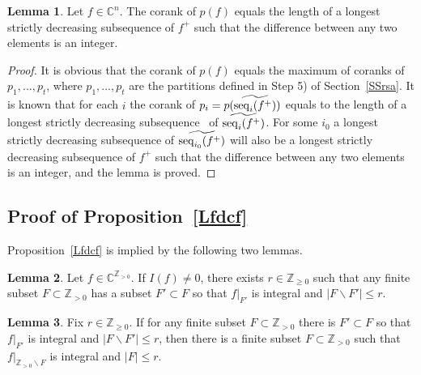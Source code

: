 \documentclass[10pt]{amsart}\oddsidemargin -1mm \evensidemargin -1mm \topmargin -15mm\headheight5mm \headsep 3.5mm \textheight 245mm\textwidth 170mm %
\theoremstyle{definition}\newtheorem{theorem}{Theorem}[section]\newtheorem{lemma}[theorem]{Lemma}\newtheorem{remark}[theorem]{Remark}\newtheorem{proposition}[theorem]{Proposition}\newtheorem{corollary}[theorem]{Corollary}\newtheorem{definition}[theorem]{Definition}\newtheorem{Ex}[theorem]{Example}
\newcounter{AP}
\begin{document}
\begin{lemma}\label{Lfcrk}Let $f\in\mathbb C^n$. The corank of $p(f)$ equals the length of a longest strictly decreasing subsequence of $f^+$ such that the difference between any two elements is an integer.\end{lemma}
\begin{proof} It is obvious that the
corank of $p(f)$ equals the maximum of coranks of $p_1,..., p_t$, where $p_1,..., p_t$ are the partitions defined in Step 5) of
Section~\ref{SSrsa}. It is known that for each $i$ the corank of $p_i=p(\widetilde{\operatorname{\mathrm{seq}}_i(f^+)})$
equals to the length of a longest strictly decreasing
subsequence~\cite[p. 69, Ex. 7]{Knu} of $\widetilde{\operatorname{\mathrm{seq}}_i(f^+)}$. For some $i_0$ a longest strictly decreasing subsequence of $\widetilde{\operatorname{\mathrm{seq}}_{i_0}(f^+)}$ will also be a longest strictly decreasing subsequence of $f^+$ such that the difference between any two elements is an integer, and the lemma is proved.

\end{proof}

\subsection{Proof of
Proposition~\ref{Lfdcf}}\label{SSicf} Proposition~\ref{Lfdcf} is implied by the
following two lemmas.
\begin{lemma}\label{Lprcdm}Let $f\in \mathbb C^{\mathbb Z_{>0}}$. If $I(f)\ne0$, there exists $r\in\mathbb Z_{\ge0}$
such that any finite subset $F\subset \mathbb Z_{>0}$ has a subset
$F'\subset F$ so that $f|_{F'}$ is
integral and $|F\backslash F'|\le r$.
\end{lemma}
\begin{lemma}\label{Ldmldm}Fix $r\in\mathbb Z_{\ge0}$. If for any
finite subset $F\subset\mathbb Z_{>0}$ there is $F'\subset F$ so that $f|_{F'}$ is integral and
$|F\backslash F'|\le r$, then there
is a finite subset $F\subset \mathbb Z_{>0}$ such that
$f|_{\mathbb Z_{>0}\backslash F}$ is integral and $|F|\le
r$.\end{lemma}
\end{document}
